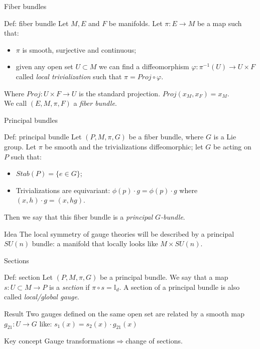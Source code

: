 \documentclass{beamer}
\begin{document}
\begin{frame}{Fiber bundles}
	\begin{exampleblock}{Def: fiber bundle}
		Let $M, E$ and $F$ be manifolds. Let $\pi: E\rightarrow M$ be a map such that:
		\begin{itemize}
			\item $\pi$ is smooth, surjective and continuous;
			\item given any open set $U\subset M$ we can find a diffeomorphism $\varphi: \pi^{-1}(U)\rightarrow U\times F$ called \textit{local trivialization} such that $\pi=Proj\circ \varphi$.
		\end{itemize}
		Where $Proj: U\times F\rightarrow U$ is the standard projection. $Proj(x_M,x_F)=x_M$.\\
		We call $(E,M,\pi,F)$ a \textit{fiber bundle}.
	\end{exampleblock}
\end{frame}
\begin{frame}{Principal bundles}
	\begin{exampleblock}{Def: principal bundle}
		Let $(P,M,\pi,G)$ be a fiber bundle, where $G$ is a Lie group. Let $\pi$ be smooth and the trivializations diffeomorphic; let $G$ be acting on $P$ such that:
		\begin{itemize}
			\item $Stab(P)=\{e\in G\}$;
			\item Trivializations are equivariant: $\phi(p)\cdot g=\phi(p)\cdot g$ where $(x,h)\cdot g=(x,hg)$.
		\end{itemize} 
		Then we say that this fiber bundle is a \textit{principal $G$-bundle}.
	\end{exampleblock}
	\begin{block}{Idea}
		The local symmetry of gauge theories will be described by a principal $SU(n)$ bundle: a manifold that locally looks like $M\times SU(n)$.
	\end{block}
\end{frame}
\begin{frame}{Sections}
	\begin{exampleblock}{Def: section}
			Let $(P,M,\pi,G)$ be a principal bundle. We say that a map \\$s:U\subset M\rightarrow P$ is a \textit{section} if $\pi\circ s=\mathbb{I}_d$. A section of a principal bundle is also called \textit{local/global gauge}.
	\end{exampleblock}
	\begin{block}{Result}
		Two gauges defined on the same open set are related by a smooth map $g_{21}:U\rightarrow G$ like: $s_1(x)=s_2(x)\cdot g_{21}(x)$
	\end{block}
	\begin{alertblock}{Key concept}
		Gauge transformations$\Longrightarrow$change of sections.
	\end{alertblock}
\end{frame}
\end{document}
